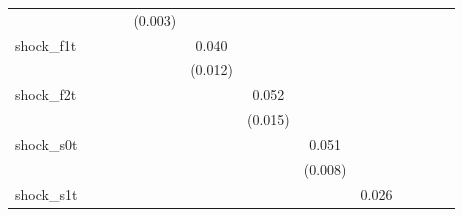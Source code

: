 {\begin{tabular}{l*{12}{c}}
            &                     &                     &                     &     (0.003)         &                     &                     &                     &                     &                     &                     &                     &                     \\
\addlinespace
shock\_f1t   &                     &                     &                     &                     &       0.040\sym{***}&                     &                     &                     &                     &                     &                     &                     \\
            &                     &                     &                     &                     &     (0.012)         &                     &                     &                     &                     &                     &                     &                     \\
\addlinespace
shock\_f2t   &                     &                     &                     &                     &                     &       0.052\sym{***}&                     &                     &                     &                     &                     &                     \\
            &                     &                     &                     &                     &                     &     (0.015)         &                     &                     &                     &                     &                     &                     \\
\addlinespace
shock\_s0t   &                     &                     &                     &                     &                     &                     &       0.051\sym{***}&                     &                     &                     &                     &                     \\
            &                     &                     &                     &                     &                     &                     &     (0.008)         &                     &                     &                     &                     &                     \\
\addlinespace
shock\_s1t   &                     &                     &                     &                     &                     &                     &                     &       0.026\sym{**} &                     &                     &                     &                     \\

\end{tabular}}
